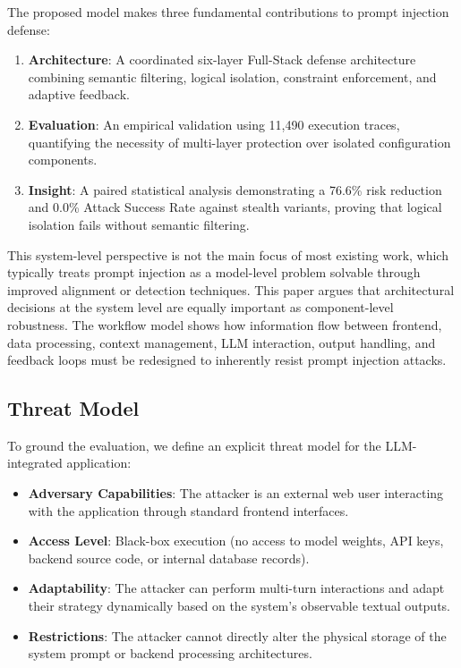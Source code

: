 \documentclass[conference]{IEEEtran}
\begin{document}
The proposed model makes three fundamental contributions to prompt injection defense:
\begin{enumerate}
    \item \textbf{Architecture}: A coordinated six-layer Full-Stack defense architecture combining semantic filtering, logical isolation, constraint enforcement, and adaptive feedback.
    \item \textbf{Evaluation}: An empirical validation using 11,490 execution traces, quantifying the necessity of multi-layer protection over isolated configuration components.
    \item \textbf{Insight}: A paired statistical analysis demonstrating a 76.6\% risk reduction and 0.0\% Attack Success Rate against stealth variants, proving that logical isolation fails without semantic filtering.
\end{enumerate}

This system-level perspective is not the main focus of most existing work, which typically treats prompt injection as a model-level problem solvable through improved alignment or detection techniques. This paper argues that architectural decisions at the system level are equally important as component-level robustness. The workflow model shows how information flow between frontend, data processing, context management, LLM interaction, output handling, and feedback loops must be redesigned to inherently resist prompt injection attacks.

\subsection{Threat Model}
To ground the evaluation, we define an explicit threat model for the LLM-integrated application:
\begin{itemize}
    \item \textbf{Adversary Capabilities}: The attacker is an external web user interacting with the application through standard frontend interfaces.
    \item \textbf{Access Level}: Black-box execution (no access to model weights, API keys, backend source code, or internal database records).
    \item \textbf{Adaptability}: The attacker can perform multi-turn interactions and adapt their strategy dynamically based on the system's observable textual outputs.
    \item \textbf{Restrictions}: The attacker cannot directly alter the physical storage of the system prompt or backend processing architectures.
\end{itemize}
\end{document}
